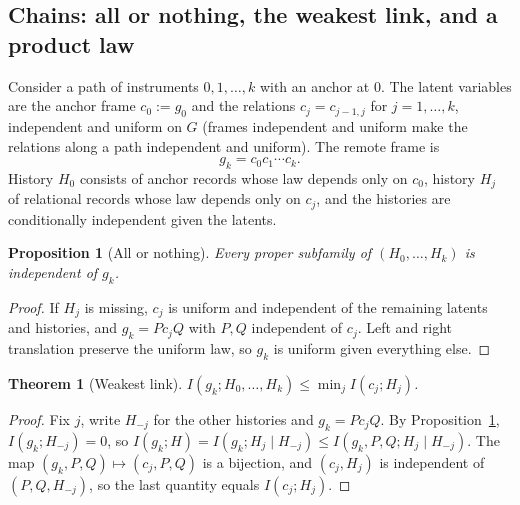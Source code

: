 \documentclass[11pt,a4paper]{article}
\newtheorem{proposition}[definition]{Proposition}
\newtheorem{theorem}[definition]{Theorem}
\begin{document}
\subsection{Chains: all or nothing, the weakest link, and a product law}

Consider a path of instruments $0,1,\dots,k$ with an anchor at $0$. The latent variables are the anchor frame $c_0:=g_0$ and the relations $c_j=c_{j-1,j}$ for $j=1,\dots,k$, independent and uniform on $G$ (frames independent and uniform make the relations along a path independent and uniform). The remote frame is
\[
 g_k=c_0c_1\cdots c_k .
\]
History $H_0$ consists of anchor records whose law depends only on $c_0$, history $H_j$ of relational records whose law depends only on $c_j$, and the histories are conditionally independent given the latents.

\begin{proposition}[All or nothing]\label{prop:aon}
Every proper subfamily of $(H_0,\dots,H_k)$ is independent of $g_k$.
\end{proposition}
\begin{proof}
If $H_j$ is missing, $c_j$ is uniform and independent of the remaining latents and histories, and $g_k=Pc_jQ$ with $P,Q$ independent of $c_j$. Left and right translation preserve the uniform law, so $g_k$ is uniform given everything else.
\end{proof}

\begin{theorem}[Weakest link]\label{thm:weakest}
$I(g_k;H_0,\dots,H_k)\le\min_jI(c_j;H_j)$.
\end{theorem}
\begin{proof}
Fix $j$, write $H_{-j}$ for the other histories and $g_k=Pc_jQ$. By Proposition~\ref{prop:aon}, $I(g_k;H_{-j})=0$, so $I(g_k;H)=I(g_k;H_j\mid H_{-j})\le I(g_k,P,Q;H_j\mid H_{-j})$. The map $(g_k,P,Q)\mapsto(c_j,P,Q)$ is a bijection, and $(c_j,H_j)$ is independent of $(P,Q,H_{-j})$, so the last quantity equals $I(c_j;H_j)$.
\end{proof}
\end{document}

